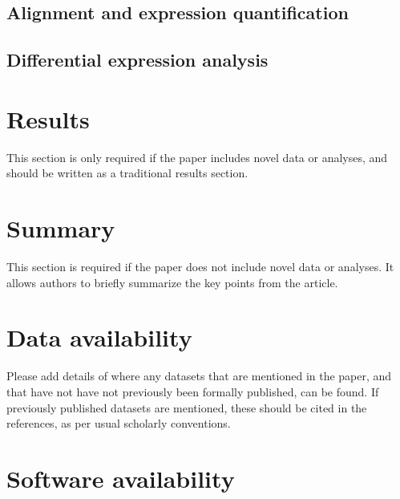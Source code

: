 \documentclass[9pt,a4paper,]{extarticle}
\begin{document}
\hypertarget{alignment-and-expression-quantification}{%
\subsection{Alignment and expression quantification}\label{alignment-and-expression-quantification}}

\hypertarget{differential-expression-analysis}{%
\subsection{Differential expression analysis}\label{differential-expression-analysis}}

\hypertarget{section}{%
\subsection{}\label{section}}

\hypertarget{results}{%
\section{Results }\label{results}}

This section is only required if the paper includes novel data or analyses, and should be written as a traditional results section.

\hypertarget{summary}{%
\section{Summary }\label{summary}}

This section is required if the paper does not include novel data or analyses. It allows authors to briefly summarize the key points from the article.

\hypertarget{data-availability}{%
\section{Data availability }\label{data-availability}}

Please add details of where any datasets that are mentioned in the paper, and that have not have not previously been formally published, can be found. If previously published datasets are mentioned, these should be cited in the references, as per usual scholarly conventions.

\hypertarget{software-availability}{%
\section{Software availability}\label{software-availability}}
\end{document}

